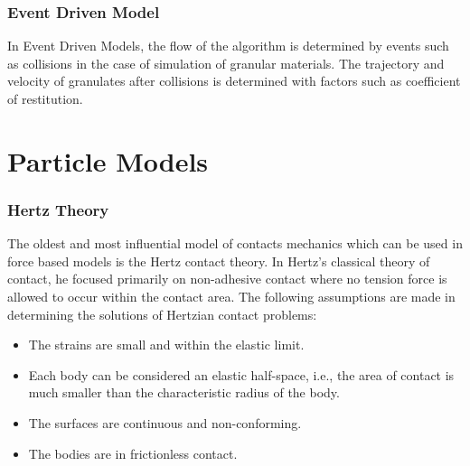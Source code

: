 \subsubsection{Event Driven Model}

In Event Driven Models, the flow of the algorithm is determined by events such as collisions in the case of simulation of granular materials. The trajectory and velocity of granulates after collisions is determined with factors such as coefficient of restitution.  


\section{Particle Models}

\subsubsection{Hertz Theory \citep{landau}}

The oldest and most influential model of contacts mechanics which can be used in force based models is the Hertz contact theory. In Hertz’s classical theory of contact, he focused primarily on non-adhesive contact where no tension force is allowed to occur within the contact area. The following assumptions are made in determining the solutions of Hertzian contact problems:

\begin{itemize}
\item The strains are small and within the elastic limit.
\item Each body can be considered an elastic half-space, i.e., the area of contact is much smaller than the characteristic radius of the body.
\item The surfaces are continuous and non-conforming.
\item The bodies are in frictionless contact.
\end{itemize}



